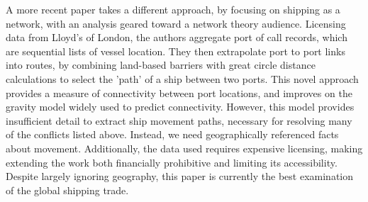 
A more recent paper \citep{Kaluza2010} takes a different approach, by focusing on shipping as a network, with an analysis geared toward a network theory audience. Licensing data from Lloyd's of London, %
 the authors aggregate port of call records, which are sequential lists of vessel location. They then extrapolate port to port links into routes, by combining land-based barriers with great circle distance calculations to select the 'path' of a ship between two ports. This novel approach provides a measure of connectivity between port locations, and improves on the gravity model widely used to predict connectivity. %
However, this model provides insufficient detail to extract ship movement paths, necessary for resolving many of the conflicts listed above. Instead, we need geographically referenced facts about movement. Additionally, the data used requires expensive licensing, making extending the work both financially prohibitive and limiting its accessibility. Despite largely ignoring geography, this paper is currently the best examination of the global shipping trade.


